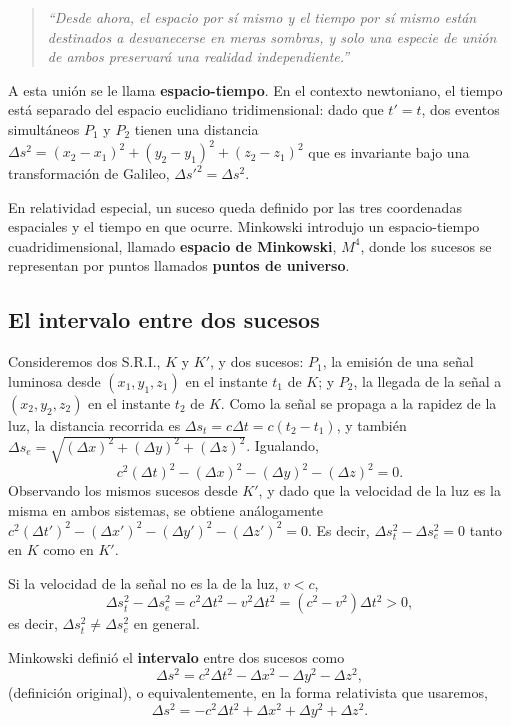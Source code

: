 \begin{quote}
\emph{``Desde ahora, el espacio por sí mismo y el tiempo por sí mismo
están destinados a desvanecerse en meras sombras, y solo una especie de
unión de ambos preservará una realidad independiente.''}
\end{quote}

A esta unión se le llama \textbf{espacio-tiempo}. En el contexto
newtoniano, el tiempo está separado del espacio euclidiano
tridimensional: dado que $t'=t$, dos eventos simultáneos $P_1$ y $P_2$
tienen una distancia $\Delta s^2=(x_2-x_1)^2+(y_2-y_1)^2+(z_2-z_1)^2$
que es invariante bajo una transformación de Galileo, $\Delta
s'^2=\Delta s^2$.

En relatividad especial, un suceso queda definido por las tres
coordenadas espaciales y el tiempo en que ocurre. Minkowski introdujo un
espacio-tiempo cuadridimensional, llamado \textbf{espacio de Minkowski},
$M^4$, donde los sucesos se representan por puntos llamados
\textbf{puntos de universo}.

\subsection{El intervalo entre dos sucesos}

Consideremos dos S.R.I., $K$ y $K'$, y dos sucesos: $P_1$, la emisión de
una señal luminosa desde $(x_1,y_1,z_1)$ en el instante $t_1$ de $K$; y
$P_2$, la llegada de la señal a $(x_2,y_2,z_2)$ en el instante $t_2$ de
$K$. Como la señal se propaga a la rapidez de la luz, la distancia
recorrida es $\Delta s_t = c\Delta t = c(t_2-t_1)$, y también
$\Delta s_e = \sqrt{(\Delta x)^2+(\Delta y)^2+(\Delta z)^2}$. Igualando,
\[
c^2(\Delta t)^2 - (\Delta x)^2-(\Delta y)^2-(\Delta z)^2 = 0 .
\]
Observando los mismos sucesos desde $K'$, y dado que la velocidad de la
luz es la misma en ambos sistemas, se obtiene análogamente
$c^2(\Delta t')^2-(\Delta x')^2-(\Delta y')^2-(\Delta z')^2=0$. Es
decir, $\Delta s_t^2-\Delta s_e^2=0$ tanto en $K$ como en $K'$.

Si la velocidad de la señal no es la de la luz, $v<c$,
\[
\Delta s_t^2 - \Delta s_e^2 = c^2\Delta t^2 - v^2\Delta t^2 =
(c^2-v^2)\Delta t^2 > 0,
\]
es decir, $\Delta s_t^2\ne\Delta s_e^2$ en general.

\begin{definicion}
Minkowski definió el \textbf{intervalo} entre dos sucesos como
\[
\Delta s^2 = c^2\Delta t^2 - \Delta x^2-\Delta y^2-\Delta z^2, \tag{42}
\]
(definición original), o equivalentemente, en la forma relativista que
usaremos,
\[
\Delta s^2 = -c^2\Delta t^2+\Delta x^2+\Delta y^2+\Delta z^2 . \tag{43}
\]
\end{definicion}

